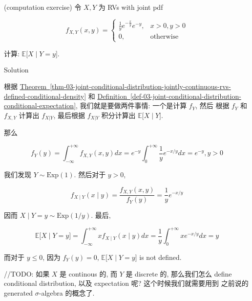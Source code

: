 \documentclass{qlnotes-export}
\begin{document}
\begin{example}

(computation exercise) 令 \(X,Y\) 为 RVs with joint pdf

\[f_{X,Y}(x,y) = \left\{ \begin{matrix}
{\frac{1}{y}e^{- \frac{x}{y}}e^{- y},} & {x > 0,y > 0} \\
{0,} & \text{otherwise}
\end{matrix} \right.\]

计算: \(\left. {\mathbb{E}}\lbrack X \middle| Y = y\rbrack \right.\).

\end{example}

\begin{qlsolution}{Solution}

根据 \hyperref[thm-03-joint-conditional-distribution-jointly-continuous-rvs-defined-conditional-density]{Theorem~\ref*{thm-03-joint-conditional-distribution-jointly-continuous-rvs-defined-conditional-density}} 和 \hyperref[def-03-joint-conditional-distribution-conditional-expectation]{Definition~\ref*{def-03-joint-conditional-distribution-conditional-expectation}}, 我们就是要做两件事情: 一个是计算 \(f_{Y}\), 然后 根据 \(f_{Y}\) 和 \(f_{X,Y}\) 计算出 \(f_{X|Y}\), 最后根据 \(f_{X|Y}\) 积分计算出 \(\left. {\mathbb{E}}\lbrack X \middle| Y\rbrack \right.\).

那么

\[f_{Y}(y) = \int_{- \infty}^{+ \infty}f_{X,Y}(x,y)dx = e^{- y}\int_{0}^{+ \infty}\frac{1}{y}e^{- x/y}dx = e^{- y},y > 0\]

我们发现 \(Y \sim \text{Exp}(1)\). 然后对于 \(y > 0\),

\[f_{X \mid Y}(x \mid y) = \frac{f_{X,Y}(x,y)}{f_{Y}(y)} = \frac{1}{y}e^{- x/y}\]

因而 \(\left. X \middle| Y = y \sim \text{Exp}(1/y) \right.\). 最后,

\[{\mathbb{E}}\lbrack X \mid Y = y\rbrack = \int_{- \infty}^{+ \infty}xf_{X \mid Y}(x \mid y)dx = \frac{1}{y}\int_{0}^{+ \infty}xe^{- x/y}dx = y\]

而对于 \(y \leq 0\), 因为 \(f_{Y}(y) = 0\), \({\mathbb{E}}\lbrack X \mid Y = y\rbrack\) is not defined.

\end{qlsolution}

//TODO: 如果 \(X\) 是 continous 的, 而 \(Y\) 是 discrete 的, 那么我们怎么 define conditional distribution, 以及 expectation 呢? 这个时候我们就需要用到 之前说的 generated \(\sigma\)-algebra 的概念了.
\end{document}
